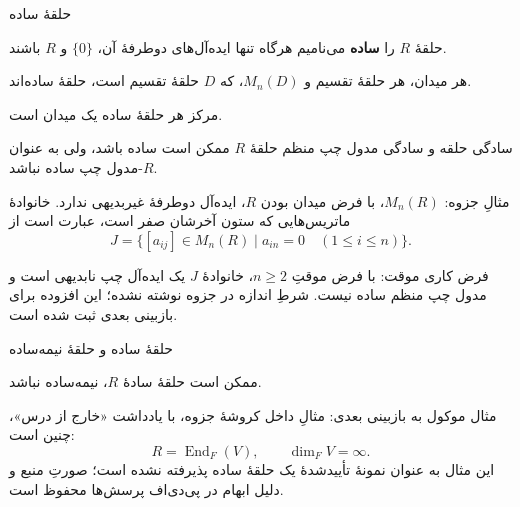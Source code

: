 \begin{frame}[t]{حلقهٔ ساده}
    \label{lec14:simple-ring}
    \begin{definition}
        حلقهٔ \(R\) را \textbf{ساده}  می‌نامیم هرگاه تنها ایده‌آل‌های دوطرفهٔ آن، \(\{0\}\) و \(R\) باشند.
    \end{definition}
    \begin{example}
        هر میدان، هر حلقهٔ تقسیم و \(M_n(D)\)، که \(D\) حلقهٔ تقسیم است، حلقهٔ ساده‌اند.
    \end{example}
    \begin{remark}
        مرکز هر حلقهٔ ساده یک میدان است.
    \end{remark}
\end{frame}

\begin{frame}[t]{سادگی حلقه و سادگی مدول چپ منظم}
    \label{lec14:simple-ring-vs-module}
    حلقهٔ \(R\) ممکن است ساده باشد، ولی به عنوان \(R\)-مدول چپ ساده نباشد.
    \medskip

    مثالِ جزوه: \(M_n(R)\)، با فرض میدان بودن \(R\)، ایده‌آل دوطرفهٔ غیربدیهی ندارد. خانوادهٔ ماتریس‌هایی که ستون آخرشان صفر است، عبارت است از
    \[
        J=\{[a_{ij}]\in M_n(R)\mid a_{in}=0\quad(1\leq i\leq n)\}.
    \]
    \begin{alertblock}{فرض کاری موقت: }
        با فرض موقتِ \(n\geq2\)، خانوادهٔ \(J\) یک ایده‌آل چپ نابدیهی است و مدول چپ منظم ساده نیست. شرطِ اندازه در جزوه نوشته نشده؛ این افزوده برای بازبینی بعدی ثبت شده است.
    \end{alertblock}
\end{frame}

\begin{frame}[t]{حلقهٔ ساده و حلقهٔ نیمه‌ساده}
    \label{lec14:simple-vs-semisimple}
    \begin{remark}
        ممکن است حلقهٔ سادهٔ \(R\)، نیمه‌ساده نباشد.
    \end{remark}
    \begin{alertblock}{مثال موکول به بازبینی بعدی: }
        مثالِ داخل کروشهٔ جزوه، با یادداشت «خارج از درس»، چنین است:
        \[
            R=\operatorname{End}_F(V),\qquad \dim_F V=\infty.
        \]
        این مثال به عنوان نمونهٔ تأییدشدهٔ یک حلقهٔ ساده پذیرفته نشده است؛ صورتِ منبع و دلیل ابهام در پی‌دی‌اف پرسش‌ها محفوظ است.
    \end{alertblock}
\end{frame}

